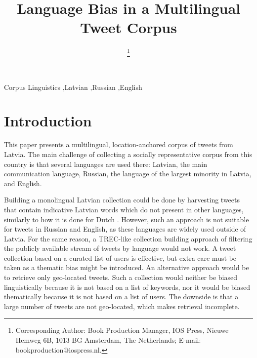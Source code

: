 \documentclass{IOS-Book-Article}
\begin{document}
\begin{frontmatter}              %

\title{Language Bias in a Multilingual Tweet Corpus}

\author[A]{ %
\thanks{Corresponding Author: Book Production Manager, IOS Press, Nieuwe Hemweg 6B,
1013 BG Amsterdam, The Netherlands; E-mail:
bookproduction@iospress.nl.}}


\address[A]{Confidential Review Copy, Do Not Distribute}

%

\begin{keyword}
Corpus Linguistics \sep Latvian \sep Russian \sep English
\end{keyword}
\end{frontmatter}

\thispagestyle{empty}
\pagestyle{empty}

\section*{Introduction}

This paper presents a multilingual, location-anchored corpus of tweets from Latvia. The main challenge of collecting a socially representative corpus from this country is that several languages are used there: Latvian, the main communication language, Russian, the language of the largest minority in Latvia, and English.

Building a monolingual Latvian collection could be done by harvesting tweets that contain indicative Latvian words which do not present in other languages, similarly to how it is done for Dutch \cite{sang2013}. However, such an approach is not suitable for tweets in Russian and English, as these languages are widely used outside of Latvia.
%
For the same reason, a TREC-like collection building approach \cite{lin2016overview} of filtering the publicly available stream of tweets by language would not work.
%
A tweet collection based on a curated list of users \cite{SANVICENTE16.465} is effective, but extra care must be taken as a thematic bias might be introduced.
%
An alternative approach would be to retrieve only geo-located tweets. Such a collection would neither be biased linguistically because it is not based on a list of keywords, nor it would be biased thematically because it is not based on a list of users. The downside is that a large number of tweets are not geo-located, which makes retrieval incomplete.
\end{document}
